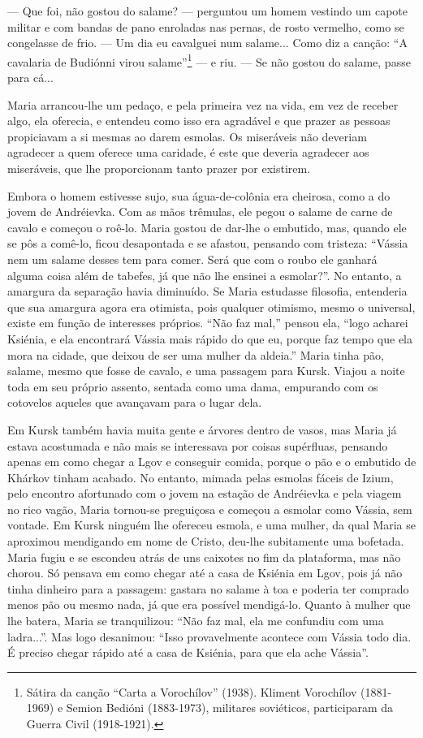 --- Que foi, não gostou do salame? --- perguntou um homem vestindo um
capote militar e com bandas de pano enroladas nas pernas, de rosto
vermelho, como se congelasse de frio. --- Um dia eu cavalguei num
salame... Como diz a canção: ``A cavalaria de Budiónni virou
salame''\footnote{Sátira da canção ``Carta a Vorochílov'' (1938).
  Kliment Vorochílov (1881-1969) e Semion Bedióni (1883-1973), militares
  soviéticos, participaram da Guerra Civil (1918-1921).} --- e riu. ---
Se não gostou do salame, passe para cá...

Maria arrancou-lhe um pedaço, e pela primeira vez na vida, em vez de
receber algo, ela oferecia, e entendeu como isso era agradável e que
prazer as pessoas propiciavam a si mesmas ao darem esmolas. Os
miseráveis não deveriam agradecer a quem oferece uma caridade, é este
que deveria agradecer aos miseráveis, que lhe proporcionam tanto prazer
por existirem.

Embora o homem estivesse sujo, sua água-de-colônia era cheirosa, como a
do jovem de Andréievka. Com as mãos trêmulas, ele pegou o salame de
carne de cavalo e começou o roê-lo. Maria gostou de dar-lhe o embutido,
mas, quando ele se pôs a comê-lo, ficou desapontada e se afastou,
pensando com tristeza: ``Vássia nem um salame desses tem para comer.
Será que com o roubo ele ganhará alguma coisa além de tabefes, já que
não lhe ensinei a esmolar?''. No entanto, a amargura da separação havia
diminuído. Se Maria estudasse filosofia, entenderia que sua amargura
agora era otimista, pois qualquer otimismo, mesmo o universal, existe em
função de interesses próprios. ``Não faz mal,'' pensou ela, ``logo
acharei Ksiénia, e ela encontrará Vássia mais rápido do que eu, porque
faz tempo que ela mora na cidade, que deixou de ser uma mulher da
aldeia.'' Maria tinha pão, salame, mesmo que fosse de cavalo, e uma
passagem para Kursk. Viajou a noite toda em seu próprio assento, sentada
como uma dama, empurando com os cotovelos aqueles que avançavam para o
lugar dela.

Em Kursk também havia muita gente e árvores dentro de vasos, mas Maria
já estava acostumada e não mais se interessava por coisas supérfluas,
pensando apenas em como chegar a Lgov e conseguir comida, porque o pão e
o embutido de Khárkov tinham acabado. No entanto, mimada pelas esmolas
fáceis de Izium, pelo encontro afortunado com o jovem na estação de
Andréievka e pela viagem no rico vagão, Maria tornou-se preguiçosa e
começou a esmolar como Vássia, sem vontade. Em Kursk ninguém lhe
ofereceu esmola, e uma mulher, da qual Maria se aproximou mendigando em
nome de Cristo, deu-lhe subitamente uma bofetada. Maria fugiu e se
escondeu atrás de uns caixotes no fim da plataforma, mas não chorou. Só
pensava em como chegar até a casa de Ksiénia em Lgov, pois já não tinha
dinheiro para a passagem: gastara no salame à toa e poderia ter comprado
menos pão ou mesmo nada, já que era possível mendigá-lo. Quanto à mulher
que lhe batera, Maria se tranquilizou: ``Não faz mal, ela me confundiu
com uma ladra...''. Mas logo desanimou: ``Isso provavelmente acontece
com Vássia todo dia. É preciso chegar rápido até a casa de Ksiénia, para
que ela ache Vássia''.


